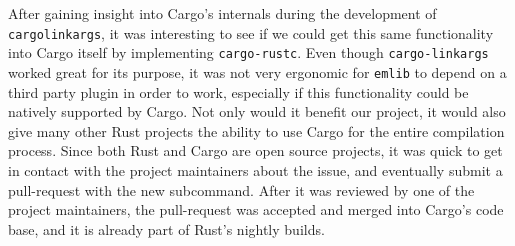 After gaining insight into Cargo's internals during the development of \texttt{cargo\-linkargs}, it was interesting to see if we could get this same functionality into Cargo itself by implementing \texttt{cargo-rustc}.
Even though \texttt{cargo-linkargs} worked great for its purpose, it was not very ergonomic for \texttt{emlib} to depend on a third party plugin in order to work, especially if this functionality could be natively supported by Cargo.
Not only would it benefit our project, it would also give many other Rust projects the ability to use Cargo for the entire compilation process.
Since both Rust and Cargo are open source projects, it was quick to get in contact with the project maintainers about the issue, and eventually submit a pull-request with the new subcommand.
After it was reviewed by one of the project maintainers, the pull-request was accepted and merged into Cargo's code base, and it is already part of Rust's nightly builds.
